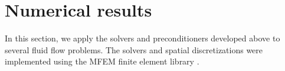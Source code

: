 \documentclass[review]{siamart}
\begin{document}
\section{Numerical results}\label{sec:numerics}

In this section, we apply the solvers and preconditioners developed above to several fluid flow problems.
The solvers and spatial discretizations were implemented using the MFEM finite element library \cite{Anderson2020}.

\end{document}
